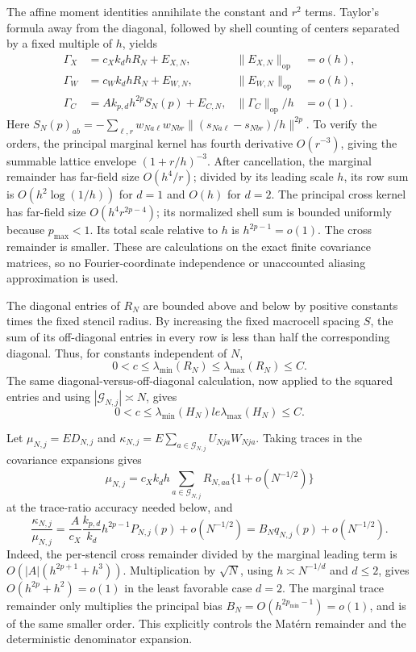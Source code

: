 The affine moment identities annihilate the constant and \(r^2\) terms.  Taylor's formula away from the diagonal, followed by shell counting of centers separated by a fixed multiple of \(h\), yields
\[
 \begin{aligned}
 \Gamma_X&=c_Xk_dhR_N+E_{X,N},&
 \|E_{X,N}\|_{\mathrm{op}}&=o(h),\\
 \Gamma_W&=c_Wk_dhR_N+E_{W,N},&
 \|E_{W,N}\|_{\mathrm{op}}&=o(h),\\
 \Gamma_C&=Ak_{p,d}h^{2p}S_N(p)+E_{C,N},&
 \|\Gamma_C\|_{\mathrm{op}}/h&=o(1).
 \end{aligned}
\]
Here \(S_N(p)_{ab}=-\sum_{\ell,r}w_{Na\ell}w_{Nbr}
\|(s_{Na\ell}-s_{Nbr})/h\|^{2p}\).  To verify the orders, the principal marginal kernel has fourth derivative \(O(r^{-3})\), giving the summable lattice envelope \((1+r/h)^{-3}\).  After cancellation, the marginal remainder has far-field size \(O(h^4/r)\); divided by its leading scale \(h\), its row sum is \(O(h^2\log(1/h))\) for \(d=1\) and \(O(h)\) for \(d=2\).  The principal cross kernel has far-field size \(O(h^4r^{2p-4})\); its normalized shell sum is bounded uniformly because \(p_{\max}<1\).  Its total scale relative to \(h\) is \(h^{2p-1}=o(1)\).  The cross remainder is smaller.  These are calculations on the exact finite covariance matrices, so no Fourier-coordinate independence or unaccounted aliasing approximation is used.

The diagonal entries of \(R_N\) are bounded above and below by positive constants times the fixed stencil radius.  By increasing the fixed macrocell spacing \(S\), the sum of its off-diagonal entries in every row is less than half the corresponding diagonal.  Thus, for constants independent of \(N\),
\[
 0<c\le\lambda_{\min}(R_N)\le\lambda_{\max}(R_N)\le C.
\]
The same diagonal-versus-off-diagonal calculation, now applied to the squared entries and using \(|\mathcal G_{N,j}|\asymp N\), gives
\[
 0<c\le\lambda_{\min}(H_N)le\lambda_{\max}(H_N)\le C.
\]

Let \(\mu_{N,j}=E D_{N,j}\) and \(\kappa_{N,j}=E\sum_{a\in\mathcal G_{N,j}}U_{Nja}W_{Nja}\).  Taking traces in the covariance expansions gives
\[
 \mu_{N,j}=c_Xk_dh\sum_{a\in\mathcal G_{N,j}}R_{N,aa}\{1+o(N^{-1/2})\}
\]
at the trace-ratio accuracy needed below, and
\[
 \frac{\kappa_{N,j}}{\mu_{N,j}}
 =\frac{A}{c_X}\frac{k_{p,d}}{k_d}h^{2p-1}P_{N,j}(p)+o(N^{-1/2})
 =B_Nq_{N,j}(p)+o(N^{-1/2}).
\]
Indeed, the per-stencil cross remainder divided by the marginal leading term is \(O(|A|(h^{2p+1}+h^3))\).  Multiplication by \(\sqrt N\), using \(h\asymp N^{-1/d}\) and \(d\le2\), gives \(O(h^{2p}+h^2)=o(1)\) in the least favorable case \(d=2\).  The marginal trace remainder only multiplies the principal bias \(B_N=O(h^{2p_{\min}-1})=o(1)\), and is of the same smaller order.  This explicitly controls the Mat\'ern remainder and the deterministic denominator expansion.

